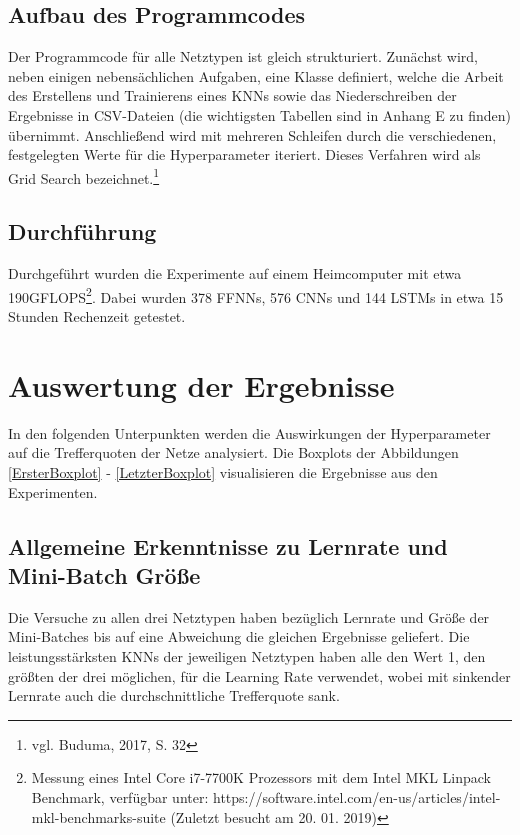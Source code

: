 \documentclass[
	a4paper,
	12pt,
	ngerman,
	oneside
]{scrreprt}											%
\newcommand{\fundamentals}[1]{vgl. Buduma, 2017, S. {#1}}
\begin{document}
			\subsection{Aufbau des Programmcodes}
				Der Programmcode für alle Netztypen ist gleich strukturiert. Zunächst wird, neben einigen nebensächlichen Aufgaben, eine Klasse definiert, welche die Arbeit des Erstellens und Trainierens eines KNNs sowie das Niederschreiben der Ergebnisse in CSV-Dateien (die wichtigsten Tabellen sind in Anhang E zu finden) übernimmt. Anschließend wird mit mehreren Schleifen durch die verschiedenen, festgelegten Werte für die Hyperparameter iteriert. Dieses Verfahren wird als Grid Search bezeichnet.\footnote{\fundamentals{32}} 

				
			\subsection{Durchführung}
				Durchgeführt wurden die Experimente auf einem Heimcomputer mit etwa 190\break GFLOPS\footnote{Messung eines Intel Core i7-7700K Prozessors mit dem Intel MKL Linpack Benchmark, verfügbar unter: https://software.intel.com/en-us/articles/intel-mkl-benchmarks-suite (Zuletzt besucht am 20. 01. 2019)}. Dabei wurden 378 FFNNs, 576 CNNs und 144 LSTMs in etwa 15 Stunden Rechenzeit getestet.
	
	
		\section{Auswertung der Ergebnisse}
			In den folgenden Unterpunkten werden die Auswirkungen der Hyperparameter auf die Trefferquoten der Netze analysiert. Die Boxplots der Abbildungen \ref{ErsterBoxplot} - \ref{LetzterBoxplot} visualisieren die Ergebnisse aus den Experimenten.

			\subsection{Allgemeine Erkenntnisse zu Lernrate und Mini-Batch Größe}
				Die Versuche zu allen drei Netztypen haben bezüglich Lernrate und Größe der Mini-Batches bis auf eine Abweichung die gleichen Ergebnisse geliefert. Die leistungsstärksten KNNs der jeweiligen Netztypen haben alle den Wert 1, den größten der drei möglichen, für die Learning Rate verwendet, wobei mit sinkender Lernrate auch die durchschnittliche Trefferquote sank.
				
\end{document}
